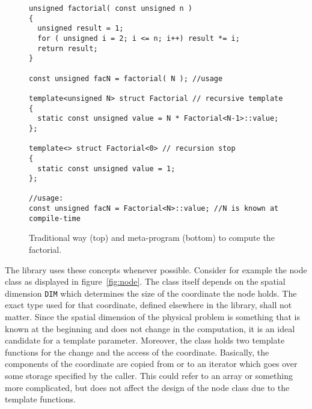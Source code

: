 \begin{figure}[htbp]
  \centering
  \begin{lstlisting}
unsigned factorial( const unsigned n ) 
{
  unsigned result = 1;
  for ( unsigned i = 2; i <= n; i++) result *= i;
  return result;
}

const unsigned facN = factorial( N ); //usage

template<unsigned N> struct Factorial // recursive template
{
  static const unsigned value = N * Factorial<N-1>::value;
};

template<> struct Factorial<0> // recursion stop
{
  static const unsigned value = 1;
};

//usage:
const unsigned facN = Factorial<N>::value; //N is known at compile-time
\end{lstlisting}

  \caption{Traditional way (top) and meta-program (bottom) to compute the factorial.}
  \label{fig:meta}
\end{figure}

The library \IS{} uses these concepts whenever possible. Consider for
example the node class as displayed in figure~\ref{fig:node}. The
class itself depends on the spatial dimension \texttt{DIM} which
determines the size of the coordinate the node holds. The exact type
used for that coordinate, defined elsewhere in the library, shall not
matter. Since the spatial dimension of the physical problem is
something that is known at the beginning and does not change in the
computation, it is an ideal candidate for a template
parameter. Moreover, the class holds two template functions for the
change and the access of the coordinate. Basically, the components of
the coordinate are copied from or to an iterator which goes over some
storage specified by the caller. This could refer to an array or
something more complicated, but does not affect the design of the node
class due to the template functions.

